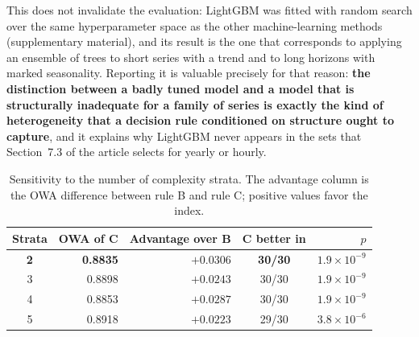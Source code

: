 This does not invalidate the evaluation: LightGBM was fitted with random search over
the same hyperparameter space as the other machine-learning methods (supplementary
material), and its result is the one that corresponds to applying an ensemble of trees
to short series with a trend and to long horizons with marked seasonality. Reporting it
is valuable precisely for that reason: \textbf{the distinction between a badly tuned
model and a model that is structurally inadequate for a family of series is exactly the
kind of heterogeneity that a decision rule conditioned on structure ought to capture},
and it explains why LightGBM never appears in the sets that Section~7.3 of the article
selects for yearly or hourly.


\begin{table}[htbp]
\centering
\caption{Sensitivity to the number of complexity strata. The advantage column is the
OWA difference between rule B and rule C; positive values favor the index.}
\label{tab:estratos}
\begin{tabular}{crrcr}
\toprule
\textbf{Strata} & \textbf{OWA of C} & \textbf{Advantage over B} &
\textbf{C better in} & \textbf{$p$} \\
\midrule
\textbf{2} & \textbf{0.8835} & \textbf{$+0.0306$} & \textbf{30/30} & $1.9\times10^{-9}$ \\
3 & 0.8898 & $+0.0243$ & 30/30 & $1.9\times10^{-9}$ \\
4 & 0.8853 & $+0.0287$ & 30/30 & $1.9\times10^{-9}$ \\
5 & 0.8918 & $+0.0223$ & 29/30 & $3.8\times10^{-6}$ \\
\bottomrule
\end{tabular}
\end{table}


